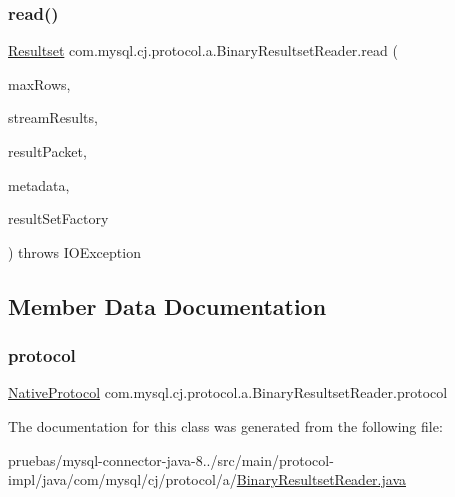 \subsubsection{\texorpdfstring{read()}{read()}}
{\footnotesize\ttfamily \mbox{\hyperlink{interfacecom_1_1mysql_1_1cj_1_1protocol_1_1_resultset}{Resultset}} com.\+mysql.\+cj.\+protocol.\+a.\+Binary\+Resultset\+Reader.\+read (\begin{DoxyParamCaption}\item[{int}]{max\+Rows,  }\item[{boolean}]{stream\+Results,  }\item[{\mbox{\hyperlink{classcom_1_1mysql_1_1cj_1_1protocol_1_1a_1_1_native_packet_payload}{Native\+Packet\+Payload}}}]{result\+Packet,  }\item[{\mbox{\hyperlink{interfacecom_1_1mysql_1_1cj_1_1protocol_1_1_column_definition}{Column\+Definition}}}]{metadata,  }\item[{\mbox{\hyperlink{interfacecom_1_1mysql_1_1cj_1_1protocol_1_1_protocol_entity_factory}{Protocol\+Entity\+Factory}}$<$ \mbox{\hyperlink{interfacecom_1_1mysql_1_1cj_1_1protocol_1_1_resultset}{Resultset}}, \mbox{\hyperlink{classcom_1_1mysql_1_1cj_1_1protocol_1_1a_1_1_native_packet_payload}{Native\+Packet\+Payload}} $>$}]{result\+Set\+Factory }\end{DoxyParamCaption}) throws I\+O\+Exception}



\subsection{Member Data Documentation}
\mbox{\label{classcom_1_1mysql_1_1cj_1_1protocol_1_1a_1_1_binary_resultset_reader_a959b57d9bb0eb1092dc414611100a121}} 
\subsubsection{\texorpdfstring{protocol}{protocol}}
{\footnotesize\ttfamily \mbox{\hyperlink{classcom_1_1mysql_1_1cj_1_1protocol_1_1a_1_1_native_protocol}{Native\+Protocol}} com.\+mysql.\+cj.\+protocol.\+a.\+Binary\+Resultset\+Reader.\+protocol\hspace{0.3cm}{\ttfamily [protected]}}



The documentation for this class was generated from the following file\+:\begin{DoxyCompactItemize}
\item 
pruebas/mysql-\/connector-\/java-\/8../src/main/protocol-\/impl/java/com/mysql/cj/protocol/a/\mbox{\hyperlink{_binary_resultset_reader_8java}{Binary\+Resultset\+Reader.\+java}}\end{DoxyCompactItemize}

